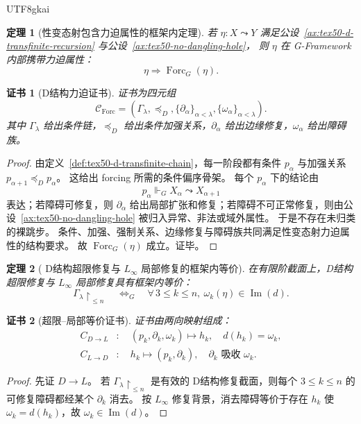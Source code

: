 \documentclass[12pt]{article}
\newtheorem{theorem}{定理}[section]
\newtheorem{Certificate}{证书}[section]
\newcommand{\GFramework}{\textsf{G-Framework}}
\newcommand{\Linfty}{\ensuremath{L_\infty}}
\newcommand{\Imop}{\operatorname{Im}}
\newcommand{\Forc}{\operatorname{Forc}}
\begin{document}
\begin{CJK*}{UTF8}{gkai}
\begin{theorem}[性变态射包含力迫属性的框架内定理]
\label{thm:tex50-d-forcing-internal}
若 $\eta:X\leadsto Y$ 满足公设~\ref{ax:tex50-d-transfinite-recursion} 与公设~\ref{ax:tex50-no-dangling-hole}，
则 $\eta$ 在 \GFramework{} 内部携带力迫属性：
\[
  \eta
  \Longrightarrow
  \Forc_G(\eta).
\]
\end{theorem}

\begin{Certificate}[D结构力迫证书]
证书为四元组
\[
  \mathcal C_{\Forc}
  =
  (\Gamma_\lambda,\preceq_D,\{\partial_\alpha\}_{\alpha<\lambda},\{\omega_\alpha\}_{\alpha<\lambda}).
\]
其中 $\Gamma_\lambda$ 给出条件链，$\preceq_D$ 给出条件加强关系，$\partial_\alpha$ 给出边缘修复，$\omega_\alpha$ 给出障碍族。
\end{Certificate}

\begin{proof}
由定义~\ref{def:tex50-d-transfinite-chain}，每一阶段都有条件 $p_\alpha$ 与加强关系 $p_{\alpha+1}\preceq_D p_\alpha$。
这给出 forcing 所需的条件偏序骨架。
每个 $p_\alpha$ 下的结论由
\[
  p_\alpha\Vdash_G X_\alpha\leadsto X_{\alpha+1}
\]
表达；若障碍可修复，则 $\partial_\alpha$ 给出局部扩张和修复；若障碍不可正常修复，则由公设~\ref{ax:tex50-no-dangling-hole} 被归入异常、非法或域外属性。
于是不存在未归类的裸跳步。
条件、加强、强制关系、边缘修复与障碍族共同满足性变态射力迫属性的结构要求。
故 $\Forc_G(\eta)$ 成立。证毕。
\end{proof}

\begin{theorem}[
  \texorpdfstring
  {D结构超限修复与 $L_\infty$ 局部修复的框架内等价}
  {D-structure transfinite repair and L-infinity local repair}
]
\label{thm:tex50-d-linfty-equivalence}
在有限阶截面上，D结构超限修复与 \Linfty{} 局部修复具有框架内等价：
\[
  \Gamma_\lambda\!\restriction_{\le n}
  \quad\Longleftrightarrow_G\quad
  \forall\,3\le k\le n,\ \omega_k(\eta)\in\Imop(d).
\]
\end{theorem}

\begin{Certificate}[超限--局部等价证书]
证书由两向映射组成：
\[
\begin{aligned}
  C_{D\to L}&:\quad
  (p_k,\partial_k,\omega_k)\mapsto h_k,\quad d(h_k)=\omega_k,\\
  C_{L\to D}&:\quad
  h_k\mapsto(p_k,\partial_k),\quad \partial_k\text{ 吸收 }\omega_k.
\end{aligned}
\]
\end{Certificate}

\begin{proof}
先证 $D\to L$。
若 $\Gamma_\lambda\restriction_{\le n}$ 是有效的 D结构修复截面，则每个 $3\le k\le n$ 的可修复障碍都经某个 $\partial_k$ 消去。
按 \Linfty{} 修复背景，消去障碍等价于存在 $h_k$ 使 $\omega_k=d(h_k)$，故 $\omega_k\in\Imop(d)$。


\end{proof}
\end{CJK*}
\end{document}
